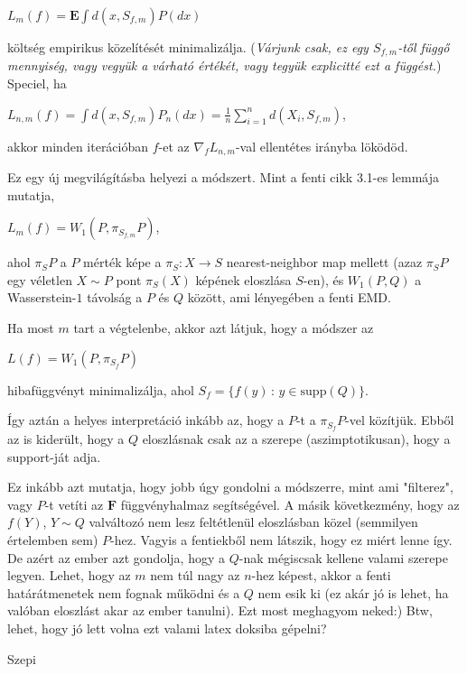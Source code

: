 \documentclass[a4paper]{article}
\newcommand{\wrk}[1]{\textcolor[rgb]{.0,.6,.0}{(\textsl{#1})}}
\newcommand{\wrk}[1]{}
\newcommand{\cF}{\mathbf{F}}
\newcommand{\EE}{\mathbf{E}}
\begin{document}
$L_m(f) = \EE{\int d(x, S_{f,m} ) P(dx)}$

költség empirikus közelítését minimalizálja. \wrk{Várjunk csak, ez egy $S_{f,m}$-től függő mennyiség, vagy vegyük a várható értékét, vagy tegyük explicitté ezt a függést.} Speciel, ha

$L_{n,m}(f) = \int d(x, S_{f,m} ) P_n(dx) = \frac1n \sum_{i=1}^n d(X_i, S_{f,m} )$,

akkor minden iterációban $f$-et az $\nabla_f L_{n,m}$-val ellentétes irányba löködöd.

Ez egy új megvilágításba helyezi a módszert.
Mint a fenti cikk 3.1-es lemmája mutatja,

$L_m(f) = W_1(P, \pi_{S_{f,m}} P )$,

ahol $\pi_S P$ a $P$ mérték képe a $\pi_S: X \to S$ nearest-neighbor map mellett (azaz $\pi_S P$ egy véletlen $X\sim P$ pont $\pi_S(X)$ képének eloszlása $S$-en), és $W_1(P,Q)$ a Wasserstein-$1$ távolság a $P$ és $Q$ között, ami lényegében a fenti EMD.

Ha most $m$ tart a végtelenbe, akkor azt látjuk, hogy a módszer az

$L(f) = W_1(P,\pi_{S_f}P)$

hibafüggvényt minimalizálja, ahol $S_f = \{ f(y)\,:\, y\in \mathrm{supp}(Q) \}$.

Így aztán a helyes interpretáció inkább az, hogy a $P$-t a $\pi_{S_f} P$-vel közítjük. Ebből az is kiderült, hogy a $Q$ eloszlásnak csak az a szerepe (aszimptotikusan), hogy a support-ját adja.

Ez inkább azt mutatja, hogy jobb úgy gondolni a módszerre, mint ami "filterez", vagy $P$-t vetíti az $\cF$ függvényhalmaz segítségével.
A másik következmény, hogy az $f(Y)$, $Y\sim Q$ valváltozó nem lesz feltétlenül eloszlásban közel (semmilyen értelemben sem) $P$-hez.
Vagyis a fentiekből nem látszik, hogy ez miért lenne így. De azért az ember azt gondolja, hogy a $Q$-nak mégiscsak kellene valami szerepe legyen. Lehet, hogy az $m$ nem túl nagy az $n$-hez képest, akkor a fenti határátmenetek nem fognak működni és a $Q$ nem esik ki (ez akár jó is lehet, ha valóban eloszlást akar az ember tanulni). Ezt most meghagyom neked:) Btw, lehet, hogy jó lett volna ezt valami latex doksiba gépelni?

Szepi
\end{document}
